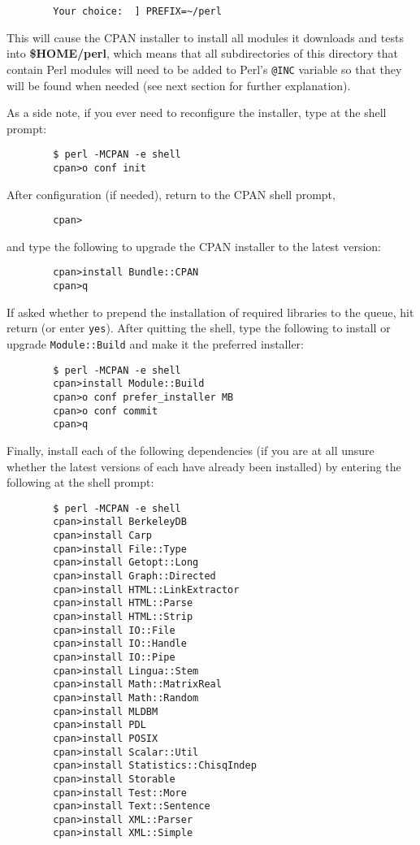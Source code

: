 \begin{verbatim}
        Your choice:  ] PREFIX=~/perl
\end{verbatim}


This will cause the CPAN installer to install all modules it downloads and tests into \textbf{\$HOME/perl}, which means that all subdirectories of this directory that contain Perl modules will need to be added to Perl's \texttt{@INC} variable so that they will be found when needed (see next section for further explanation).



As a side note, if you ever need to reconfigure the installer, type at the shell prompt:

\begin{verbatim}
        $ perl -MCPAN -e shell
        cpan>o conf init
\end{verbatim}


After configuration (if needed), return to the CPAN shell prompt,

\begin{verbatim}
        cpan>
\end{verbatim}


and type the following to upgrade the CPAN installer to the latest version:

\begin{verbatim}
        cpan>install Bundle::CPAN
        cpan>q
\end{verbatim}


If asked whether to prepend the installation of required libraries to the queue, hit return (or enter \texttt{yes}). After quitting the shell, type the following to install or upgrade \texttt{Module::Build} and make it the preferred installer:

\begin{verbatim}
        $ perl -MCPAN -e shell
        cpan>install Module::Build
        cpan>o conf prefer_installer MB
        cpan>o conf commit
        cpan>q
\end{verbatim}


Finally, install each of the following dependencies (if you are at all unsure whether the latest versions of each have already been installed) by entering the following at the shell prompt:

\begin{verbatim}
        $ perl -MCPAN -e shell
        cpan>install BerkeleyDB
        cpan>install Carp
        cpan>install File::Type
        cpan>install Getopt::Long
        cpan>install Graph::Directed
        cpan>install HTML::LinkExtractor
        cpan>install HTML::Parse
        cpan>install HTML::Strip
        cpan>install IO::File
        cpan>install IO::Handle
        cpan>install IO::Pipe
        cpan>install Lingua::Stem
        cpan>install Math::MatrixReal
        cpan>install Math::Random
        cpan>install MLDBM
        cpan>install PDL
        cpan>install POSIX
        cpan>install Scalar::Util
        cpan>install Statistics::ChisqIndep
        cpan>install Storable
        cpan>install Test::More
        cpan>install Text::Sentence
        cpan>install XML::Parser
        cpan>install XML::Simple
\end{verbatim}
